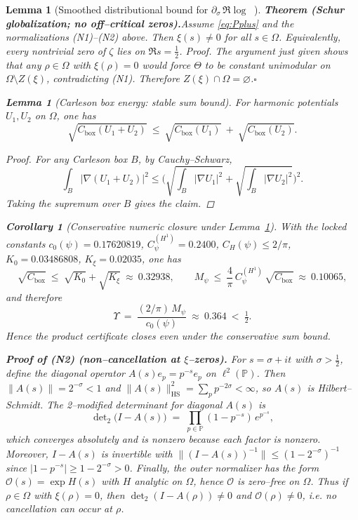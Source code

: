 \documentclass[11pt]{article}
\newtheorem{lemma}[theorem]{Lemma}
\newtheorem{corollary}[theorem]{Corollary}
\theoremstyle{definition}
\theoremstyle{remark}
\DeclareMathOperator{\dettwo}{det_2}
\begin{document}
\begin{lemma}[Smoothed distributional bound for $\partial_\sigma\,\Re\log\dettwo$]
\bigskip
\noindent\textbf{Theorem (Schur globalization; no off--critical zeros).}\label{thm:schur-global}
Assume \eqref{eq:Pplus} and the normalizations \textnormal{(N1)}--\textnormal{(N2)} above.
Then $\xi(s)\neq0$ for all $s\in\Omega$. Equivalently, every nontrivial zero of $\zeta$ lies on $\Re s=\tfrac12$.
\emph{Proof.} The argument just given shows that any $\rho\in\Omega$ with $\xi(\rho)=0$
would force $\Theta$ to be constant unimodular on $\Omega\setminus Z(\xi)$, contradicting (N1).
Therefore $Z(\xi)\cap\Omega=\varnothing$.\hfill$\square$

\begin{lemma}[Carleson box energy: stable sum bound]\label{lem:carleson-sum}
For harmonic potentials $U_1,U_2$ on $\Omega$, one has
\[
\sqrt{C_{\mathrm{box}}(U_1+U_2)}\ \le\
\sqrt{C_{\mathrm{box}}(U_1)}\ +\ \sqrt{C_{\mathrm{box}}(U_2)}.
\]
\end{lemma}

\begin{proof}
For any Carleson box $B$, by Cauchy–Schwarz,
\[
\int_{B} |\nabla(U_1+U_2)|^2
\le \bigl(\sqrt{\int_B |\nabla U_1|^2}+\sqrt{\int_B |\nabla U_2|^2}\bigr)^2.
\]
Taking the supremum over $B$ gives the claim.
\end{proof}
\begin{corollary}[Conservative numeric closure under Lemma~\ref{lem:carleson-sum}]\label{cor:conservative-closure}
With the locked constants \(c_0(\psi)=0.17620819\), \(C_\psi^{(H^1)}=0.2400\), \(C_H(\psi)\le 2/\pi\), \(K_0=0.03486808\), \(K_\xi=0.02035\), one has
\[
\sqrt{C_{\mathrm{box}}}\ \le\ \sqrt{K_0}+\sqrt{K_\xi}\ \approx\ 0.32938,\qquad
M_\psi\ \le\ \frac{4}{\pi}\,C_\psi^{(H^1)}\,\sqrt{C_{\mathrm{box}}}\ \approx\ 0.10065,
\]
and therefore
\[
\Upsilon\ =\ \frac{(2/\pi)\,M_\psi}{c_0(\psi)}\ \approx\ 0.364\ <\ \tfrac12.
\]
Hence the product certificate closes even under the conservative sum bound.
\end{corollary}
\medskip
\noindent\textbf{Proof of (N2) (non--cancellation at $\xi$--zeros).}
For $s=\sigma+it$ with $\sigma>\tfrac12$, define the diagonal operator $A(s)e_p=p^{-s}e_p$ on $\ell^2(\mathbb P)$. Then $\|A(s)\|=2^{-\sigma}<1$ and $\|A(s)\|_{\mathrm{HS}}^2=\sum_{p}p^{-2\sigma}<\infty$, so $A(s)$ is Hilbert--Schmidt. The 2--modified determinant for diagonal $A(s)$ is
\[
\det\nolimits_2\!\big(I-A(s)\big)\;=\;\prod_{p\in\mathbb P}(1-p^{-s})\,e^{p^{-s}},
\]
which converges absolutely and is nonzero because each factor is nonzero. Moreover, $I-A(s)$ is invertible with $\|(I-A(s))^{-1}\|\le (1-2^{-\sigma})^{-1}$ since $|1-p^{-s}|\ge 1-2^{-\sigma}>0$. Finally, the outer normalizer has the form $\mathcal O(s)=\exp H(s)$ with $H$ analytic on $\Omega$, hence $\mathcal O$ is zero--free on $\Omega$. Thus if $\rho\in\Omega$ with $\xi(\rho)=0$, then $\det_2(I-A(\rho))\neq0$ and $\mathcal O(\rho)\neq0$, i.e. no cancellation can occur at $\rho$.

\end{lemma}
\end{document}

